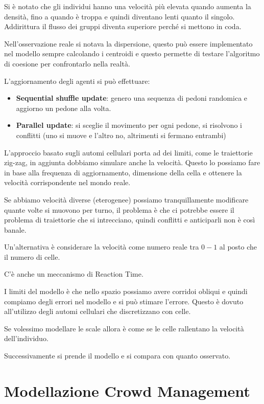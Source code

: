 Si è notato che gli individui hanno una velocità più elevata quando aumenta la
densità, fino a quando è troppa e quindi diventano lenti quanto il singolo.
Addirittura il flusso dei gruppi diventa superiore perché si mettono in coda.

Nell'osservazione reale si notava la dispersione, questo può essere implementato
nel modello sempre calcolando i centroidi e questo permette di testare l'algoritmo
di coesione per confrontarlo nella realtà.

L'aggiornamento degli agenti si può effettuare:
\begin{itemize}
    \item \textbf{Sequential shuffle update}: genero una sequenza di pedoni
          randomica e aggiorno un pedone alla volta.
    \item \textbf{Parallel update}: si sceglie il movimento per ogni pedone, si
          risolvono i conflitti (uno si muove e l'altro no, altrimenti si fermano
          entrambi)
\end{itemize}
L'approccio basato sugli automi cellulari porta ad dei limiti, come le traiettorie
zig-zag, in aggiunta dobbiamo simulare anche la velocità. Questo lo possiamo fare
in base alla frequenza di aggiornamento, dimensione della cella e ottenere la
velocità corrispondente nel mondo reale. 

Se abbiamo velocità diverse (eterogenee) possiamo tranquillamente modificare quante 
volte si muovono per turno, il problema è che ci potrebbe essere il problema di 
traiettorie che si intrecciano, quindi conflitti e anticiparli non è così banale.

Un'alternativa è considerare la velocità come numero reale tra $0-1$ al posto che
il numero di celle.

C'è anche un meccanismo di Reaction Time.

I limiti del modello è che nello spazio possiamo avere corridoi obliqui e quindi
compiamo degli errori nel modello e si può stimare l'errore. Questo è dovuto 
all'utilizzo degli automi cellulari che discretizzano con celle.

Se volessimo modellare le scale allora è come se le celle rallentano la velocità
dell'individuo.

Successivamente si prende il modello e si compara con quanto osservato.

\section{Modellazione Crowd Management}

